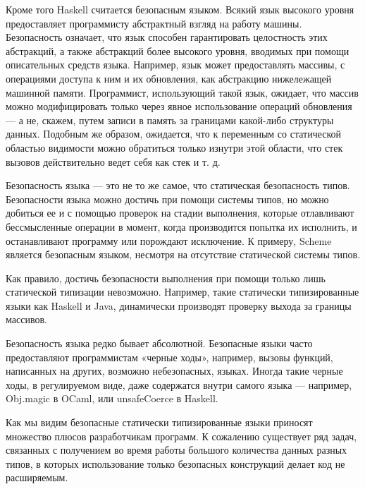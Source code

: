 Кроме того Haskell считается безопасным языком. Всякий язык высокого
уровня предоставляет программисту абстрактный взгляд на работу
машины. Безопасность означает, что язык способен гарантировать
целостность этих абстракций, а также абстракций более высокого уровня,
вводимых при помощи описательных средств языка. Например, язык может
предоставлять массивы, с операциями доступа к ним и их обновления, как
абстракцию нижележащей машинной памяти. Программист, использующий
такой язык, ожидает, что массив можно модифицировать только через
явное использование операций обновления — а не, скажем, путем записи в
память за границами какой-либо структуры данных.  Подобным же образом,
ожидается, что к переменным со статической областью видимости можно
обратиться только изнутри этой области, что стек вызовов действительно
ведет себя как стек и т. д.

Безопасность языка — это не то же самое, что статическая безопасность
типов. Безопасности языка можно достичь при помощи системы типов, но
можно добиться ее и с помощью проверок на стадии выполнения, которые
отлавливают бессмысленные операции в момент, когда производится
попытка их исполнить, и останавливают программу или порождают
исключение. К примеру, Scheme является безопасным языком, несмотря на
отсутствие статической системы типов.

Как правило, достичь безопасности выполнения при помощи только лишь
статической типизации невозможно. Например, такие статически
типизированные языки как Haskell и Java, динамически производят
проверку выхода за границы массивов.

Безопасность языка редко бывает абсолютной. Безопасные языки часто
предоставляют программистам «черные ходы», например, вызовы функций,
написанных на других, возможно небезопасных, языках. Иногда такие
черные ходы, в регулируемом виде, даже содержатся внутри самого языка
— например, Obj.magic в OCaml, или unsafeCoerce в Haskell.

Как мы видим безопасные статически типизированные языки приносят
множество плюсов разработчикам программ. К сожалению существует ряд
задач, связанных с получением во время работы большого количества
данных разных типов, в которых использование только безопасных
конструкций делает код не расширяемым.

